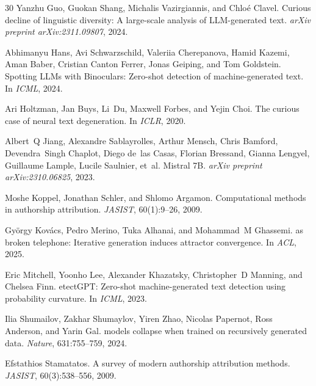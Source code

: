 \documentclass[11pt,a4paper]{article}
\begin{document}
\begin{thebibliography}{30}
Yanzhu Guo, Guokan Shang, Michalis Vazirgiannis, and Chlo{\'e} Clavel.
\newblock Curious decline of linguistic diversity: A large-scale analysis of {LLM}-generated text.
\newblock \emph{arXiv preprint arXiv:2311.09807}, 2024.

Abhimanyu Hans, Avi Schwarzschild, Valeriia Cherepanova, Hamid Kazemi, Aman Baber, Cristian Canton Ferrer, Jonas Geiping, and Tom Goldstein.
\newblock Spotting {LLM}s with {B}inoculars: Zero-shot detection of machine-generated text.
\newblock In \emph{ICML}, 2024.

Ari Holtzman, Jan Buys, Li~Du, Maxwell Forbes, and Yejin Choi.
\newblock The curious case of neural text degeneration.
\newblock In \emph{ICLR}, 2020.

Albert~Q Jiang, Alexandre Sablayrolles, Arthur Mensch, Chris Bamford, Devendra~Singh Chaplot, Diego de~las Casas, Florian Bressand, Gianna Lengyel, Guillaume Lample, Lucile Saulnier, et~al.
\newblock Mistral {7B}.
\newblock \emph{arXiv preprint arXiv:2310.06825}, 2023.

Moshe Koppel, Jonathan Schler, and Shlomo Argamon.
\newblock Computational methods in authorship attribution.
\newblock \emph{JASIST}, 60(1):9--26, 2009.

Gy{\"o}rgy Kov{\'a}cs, Pedro Merino, Tuka Alhanai, and Mohammad~M Ghassemi.
 as broken telephone: Iterative generation induces attractor convergence.
\newblock In \emph{ACL}, 2025.

Eric Mitchell, Yoonho Lee, Alexander Khazatsky, Christopher~D Manning, and Chelsea Finn.
etect{GPT}: Zero-shot machine-generated text detection using probability curvature.
\newblock In \emph{ICML}, 2023.

Ilia Shumailov, Zakhar Shumaylov, Yiren Zhao, Nicolas Papernot, Ross Anderson, and Yarin Gal.
 models collapse when trained on recursively generated data.
\newblock \emph{Nature}, 631:755--759, 2024.

Efstathios Stamatatos.
\newblock A survey of modern authorship attribution methods.
\newblock \emph{JASIST}, 60(3):538--556, 2009.


\end{thebibliography}
\end{document}
